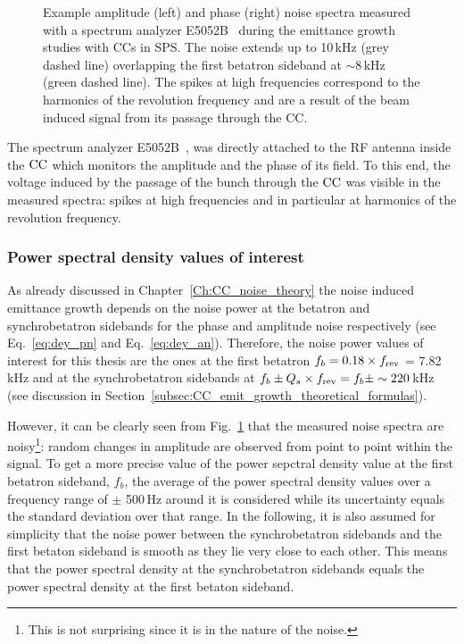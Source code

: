 \begin{figure}[!ht]
\begin{subfigure}[t]{0.45\textwidth}
   \end{subfigure}
   \hfill
    \caption{Example amplitude (left) and phase (right) noise spectra measured with a spectrum analyzer E5052B~\cite{E5052B_insight} during the emittance growth studies with CCs in SPS. The noise extends up to 10\,kHz (grey dashed line) overlapping the first betatron sideband at $\sim$8\,kHz (green dashed line). The spikes at high frequencies correspond to the harmonics of the revolution frequency and are a result of the beam induced signal from its passage through the CC.} %
    \label{fig:example_PN_and_AN_coast1_setting2}
\end{figure}

The spectrum analyzer E5052B~\cite{E5052B_insight},  was directly attached to the RF antenna inside the ${\mathrm{CC}}$ which monitors the amplitude and the phase of its field. To this end, the voltage induced by the passage of the bunch through the ${\mathrm{CC}}$ was visible in the measured spectra: spikes at high frequencies and in particular at harmonics of the revolution frequency.


\subsubsection*{Power spectral density values of interest}
As already discussed in Chapter~\ref{Ch:CC_noise_theory} the noise induced emittance growth depends on the noise power at the betatron and synchrobetatron sidebands for the phase and amplitude noise respectively (see Eq.~\eqref{eq:dey_pn} and Eq.~\eqref{eq:dey_an}). Therefore, the noise power values of interest for this thesis are the ones at the first betatron $f_b = 0.18 \times {f_\mathrm{rev}}$ = 7.82\,kHz and at the synchrobetatron sidebands at $f_b \pm {Q_s} \times {f_\mathrm{rev}}  = f_b \pm  \sim 220$\,kHz (see discussion in Section~\ref{subsec:CC_emit_growth_theoretical_formulas}).


However, it can be clearly seen from Fig.~\ref{fig:example_PN_and_AN_coast1_setting2} that the measured noise spectra are noisy\footnote{This is not surprising since it is in the nature of the noise.}: random changes in amplitude are observed from point to point within the signal. 
To get a more precise value of the power sepctral density value at the first betatron sideband, $f_b$, the average of the power spectral density values over a frequency range of $\pm$ 500\,Hz around it is considered while its uncertainty equals the standard deviation over that range. In the following, it is also assumed for simplicity that the noise power between the synchrobetatron sidebands and the first betaton sideband is smooth as they lie very close to each other. This means that the power spectral density at the synchrobetatron sidebands equals the power spectral density at the first betaton sideband.

